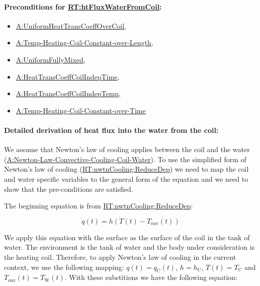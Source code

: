\documentclass[12pt]{article}
\begin{document}

\paragraph{Preconditions for \hyperref[RT:htFluxWaterFromCoil]{RT:htFluxWaterFromCoil}:}
\label{RT:htFluxWaterFromCoilPrecond}

\begin{itemize}
\item \hyperref[assumpUnifHeatTransCoeffCoil]{A:UniformHeatTransCoeffOverCoil}, 
\item \hyperref[assumpTHCCoL]{A:Temp-Heating-Coil-Constant-over-Length}, 
\item \hyperref[assumpFullyMixed]{A:UniformFullyMixed}, 
\item \hyperref[assumpHeatTransCoilIndepTime]{A:HeatTransCoeffCoilIndepTime}, 
\item \hyperref[assumpHeatTransCoilIndepTemp]{A:HeatTransCoeffCoilIndepTemp}, 
\item \hyperref[assumpTHCCoT]{A:Temp-Heating-Coil-Constant-over-Time}
\end{itemize}


\paragraph{Detailed derivation of heat flux into the water from the coil:}
\label{RT:htFluxWaterFromCoilDeriv}

We assume that Newton's law of cooling applies between the coil and the water
(\hyperref[assumpLCCCW]{A:Newton-Law-Convective-Cooling-Coil-Water}).  To use
the simplified form of Newton's law of cooling
(\hyperref[RT:nwtnCooling:ReduceDep]{RT:nwtnCooling:ReduceDep}) we need to map
the coil and water specific variables to the general form of the equation and we
need to show that the pre-conditions are satisfied.

The beginning equation is from
\hyperref[RT:nwtnCooling:ReduceDep]{RT:nwtnCooling:ReduceDep}:

\begin{displaymath} 
        q(t) = h (T(t) - T_{\text{env}}(t))
\end{displaymath}

We apply this equation with the surface as the surface of the coil in the tank
of water.  The environment is the tank of water and the body under consideration
is the heating coil.  Therefore, to apply Newton's law of cooling in the current
context, we use the following mapping: $q(t) = q_\text{C}(t)$, $h =
h_{\text{C}}$, $T(t) = T_{\text{C}}$ and $T_\text{env}(t) = T_\text{W}(t)$.
With these substitions we have the following equation:
\end{document}

